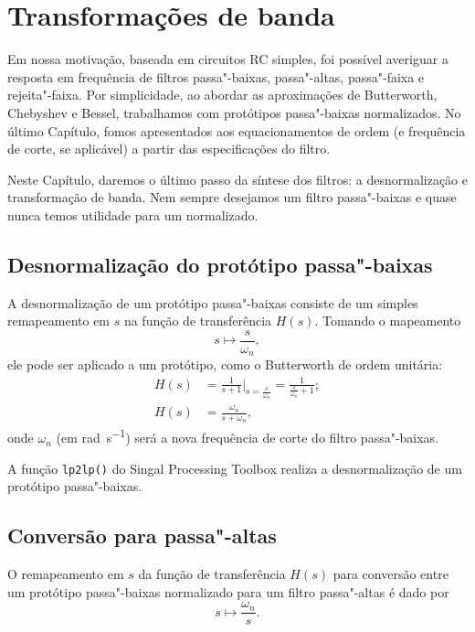 \chapter{Transformações de banda}

Em nossa motivação, baseada em circuitos RC simples, foi possível averiguar a resposta em frequência de filtros passa"-baixas, passa"-altas, passa"-faixa e rejeita"-faixa. Por simplicidade, ao abordar as aproximações de Butterworth, Chebyshev e Bessel, trabalhamos com protótipos passa"-baixas normalizados. No último Capítulo, fomos apresentados aos equacionamentos de ordem (e frequência de corte, se aplicável) a partir das especificações do filtro.

Neste Capítulo, daremos o último passo da síntese dos filtros: a desnormalização e transformação de banda. Nem sempre desejamos um filtro passa"-baixas e quase nunca temos utilidade para um normalizado.

\section{Desnormalização do protótipo passa"-baixas}

A desnormalização de um protótipo passa"-baixas consiste de um simples remapeamento em $s$ na função de transferência $H(s)$. Tomando o mapeamento
\begin{equation}
	s\mapsto\frac{s}{\omega_n},
\end{equation}
ele pode ser aplicado a um protótipo, como o Butterworth de ordem unitária:
\begin{align*}
	H(s)&=\frac{1}{s+1}\Bigg|_{s=\frac{s}{\omega_n}}=\frac{1}{\displaystyle\frac{s}{\omega_n}+1};\\
	H(s)&=\frac{\omega_n}{s+\omega_n},
\end{align*}
onde $\omega_n$ (em \unit{\radian\per\second}) será a nova frequência de corte do filtro passa"-baixas.

A função \lstinline{lp2lp()} do Singal Processing Toolbox realiza a desnormalização de um protótipo passa"-baixas.

\section{Conversão para passa"-altas}

O remapeamento em $s$ da função de transferência $H(s)$ para conversão entre um protótipo passa"-baixas normalizado para um filtro passa"-altas é dado por
\begin{equation}
	s\mapsto\frac{\omega_n}{s}.
\end{equation}

